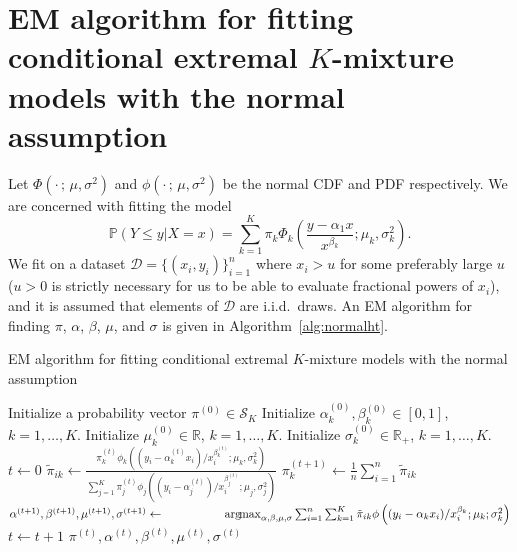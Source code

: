 \documentclass[11pt,twoside,openany]{book}
\newcommand{\p}{\mathbb{P}}
\newcommand{\reals}{\mathbb{R}}
\newcommand{\D}{\mathcal{D}}
\DeclareMathOperator*{\argmax}{arg\!max}
\numberwithin{Theorem}{chapter}
\numberwithin{Definition}{chapter}
\numberwithin{Lemma}{chapter}
\numberwithin{Algorithm}{chapter}
\numberwithin{equation}{chapter}
\begin{document}
\section{EM algorithm for fitting conditional extremal $K$-mixture models with the normal assumption}
\label{appendix:htnormalem}

Let $\Phi(\cdot\,;\,\mu,\sigma^2)$ and $\phi(\cdot\,;\,\mu,\sigma^2)$
be the normal CDF and PDF respectively.
We are concerned with fitting the model
\begin{equation}\label{eq:htemnormalass}
    \p\left(Y\leq y | X =x\right) = \sum_{k=1}^K
    \pi_k \Phi_k\left(\frac{y - \alpha_1 x}{x^{\beta_k}};\mu_k,\sigma_k^2\right).
\end{equation}
We fit on a dataset
$\mathcal{D}=\{(x_i,y_i)\}_{i=1}^n$ where $x_i > u$ for some preferably large
$u$ ($u>0$ is strictly necessary for us to be able to evaluate fractional
powers of $x_i$), and it is assumed that elements of $\D$ are i.i.d.\ draws.
An EM
algorithm for finding $\pi$, $\alpha$, $\beta$, $\mu$, and $\sigma$ is
given in Algorithm~\ref{alg:normalht}.
\begin{algorithm}
\caption{EM algorithm for fitting conditional extremal $K$-mixture models with the normal assumption\label{alg:normalht}}
\begin{algorithmic}
\State Initialize a probability vector $\pi^{(0)}\in\mathcal{S}_K$
\State Initialize $\alpha_k^{(0)},\beta_k^{(0)}\in[0,1]$, $k=1,\ldots,K$.
\State Initialize $\mu_k^{(0)}\in\reals$, $k=1,\ldots,K$.
\State Initialize $\sigma_k^{(0)}\in\reals_{+}$, $k=1,\ldots,K$.
\State $t \gets 0$
 
    \State $\tilde\pi_{ik}  \gets \frac{\pi^{(t)}_k \phi_k\left((y_i -  \alpha_k^{(t)}x_i)/x_i^{\beta_k^{(t)}};\mu_k,\sigma^2_k\right)}{\sum_{j=1}^K\pi^{(t)}_j
    \phi_j\left((y_i -  \alpha_j^{(t)})/x_i^{\beta_j^{(t)}};\mu_j,\sigma_j^2\right)}$
    \EndFor
  \EndFor
   
  \State $\pi_k^{(t+1)} \gets \frac{1}{n}\sum_{i=1}^n \tilde\pi_{ik}$
  \EndFor
  \State $\alpha^{(t+1)},\beta^{(t+1)},\mu^{(t+1)},\sigma^{(t+1)}
  \gets\newline\hspace*{5em}\argmax_{\alpha,\beta,\mu,\sigma} \sum_{i=1}^n\sum_{k=1}^K\tilde\pi_{ik}\phi\left((y_i - \alpha_k x_i)/x_i^{\beta_k};\mu_k;\sigma_k^2 \right)$ 
  \State $t \gets t + 1$
\EndWhile
\State \Return $\pi^{(t)},\alpha^{(t)},\beta^{(t)},\mu^{(t)},\sigma^{(t)}$
\end{algorithmic}
\end{algorithm}
\end{document}
